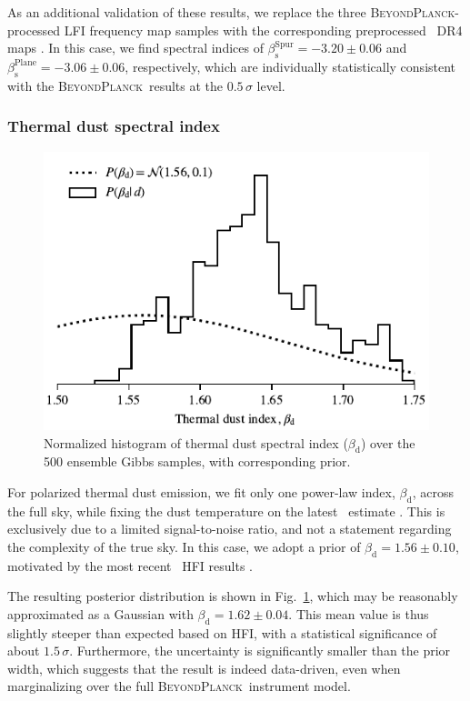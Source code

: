 \documentclass[twocolumn]{aa}
\newcommand{\BP}{\textsc{BeyondPlanck}}
\newcommand{\?}[1]{\textcolor{red}{{\bf [#1]}}}
\begin{document}
As an additional validation of these results, we replace the three
\BP-processed LFI frequency map samples with the corresponding
preprocessed \Planck\ DR4 maps \citep{planck2020-LVII}. In this case,
we find spectral indices of
${\beta_{\mathrm{s}}^{\mathrm{Spur}}=-3.20\pm0.06}$ and
${\beta_{\mathrm{s}}^{\mathrm{Plane}}=-3.06\pm0.06}$, respectively,
which are individually statistically consistent with the \BP\ results
at the $0.5\,\sigma$ level. 

\subsubsection{Thermal dust spectral index}

\begin{figure}[t]
\center
\includegraphics[width=0.95\linewidth]{figs/dust-beta_pixreg_val_histogram.pdf}
\caption{Normalized histogram of thermal dust spectral index ($\beta_{\mathrm d}$) over the 500 ensemble Gibbs samples, with corresponding prior.}\label{fig:dustbeta}
\end{figure}
 
For polarized thermal dust emission, we fit only one power-law index,
$\beta_{\mathrm{d}}$, across the full sky, while fixing the dust
temperature on the latest \Planck\ estimate \citep{planck2020-LVII}. This is
exclusively due to a limited signal-to-noise ratio, and not a
statement regarding the complexity of the true sky. In this case, we
adopt a prior of $\beta_{\mathrm{d}}=1.56\pm0.10$, motivated by the
most recent \Planck\ HFI results \citep{planck2016-l04,planck2020-LVII}. 

The resulting posterior distribution is shown in
Fig.~\ref{fig:dustbeta}, which may be reasonably approximated as a
Gaussian with $\beta_{\mathrm d}=1.62\pm 0.04$. This mean value is thus slightly
steeper than expected based on HFI, with a statistical significance of
about $1.5\,\sigma$. Furthermore, the uncertainty is significantly
smaller than the prior width, which suggests that the result is indeed
data-driven, even when marginalizing over the full \BP\ instrument
model.
\end{document}

